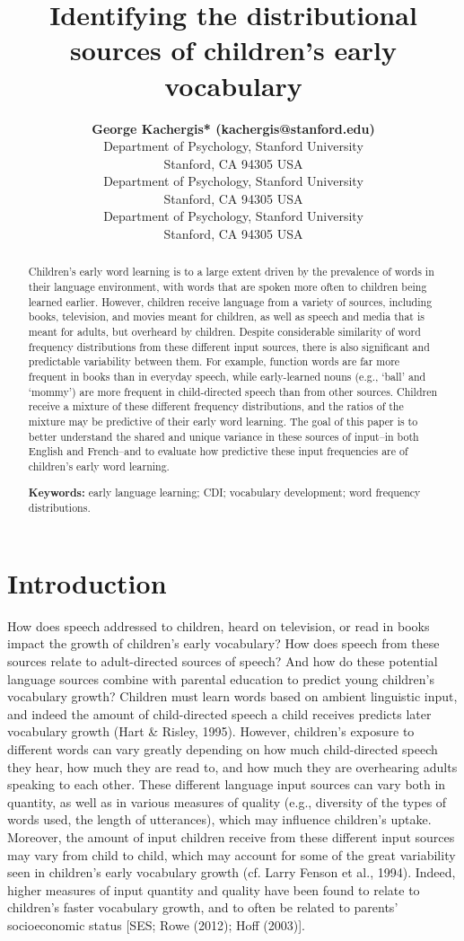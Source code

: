 \documentclass[10pt, letterpaper]{article}
\title{Identifying the distributional sources of children's early
vocabulary}
\author{{\large \bf George Kachergis* (kachergis@stanford.edu)} \\ Department of Psychology, Stanford University \\ Stanford, CA 94305 USA \AND {\large \bf Georgia Loukatou* (@stanford.edu)} \\ Department of Psychology, Stanford University \\ Stanford, CA 94305 USA \AND {\large \bf Michael C. Frank (mcfrank@stanford.edu)} \\ Department of Psychology, Stanford University \\ Stanford, CA 94305 USA}
\begin{document}
\maketitle

\begin{abstract}
Children's early word learning is to a large extent driven by the
prevalence of words in their language environment, with words that are
spoken more often to children being learned earlier. However, children
receive language from a variety of sources, including books, television,
and movies meant for children, as well as speech and media that is meant
for adults, but overheard by children. Despite considerable similarity
of word frequency distributions from these different input sources,
there is also significant and predictable variability between them. For
example, function words are far more frequent in books than in everyday
speech, while early-learned nouns (e.g., `ball' and `mommy') are more
frequent in child-directed speech than from other sources. Children
receive a mixture of these different frequency distributions, and the
ratios of the mixture may be predictive of their early word learning.
The goal of this paper is to better understand the shared and unique
variance in these sources of input--in both English and French--and to
evaluate how predictive these input frequencies are of children's early
word learning.

\textbf{Keywords:}
early language learning; CDI; vocabulary development; word frequency
distributions.
\end{abstract}

\hypertarget{introduction}{%
\section{Introduction}\label{introduction}}

How does speech addressed to children, heard on television, or read in
books impact the growth of children's early vocabulary? How does speech
from these sources relate to adult-directed sources of speech? And how
do these potential language sources combine with parental education to
predict young children's vocabulary growth? Children must learn words
based on ambient linguistic input, and indeed the amount of
child-directed speech a child receives predicts later vocabulary growth
(Hart \& Risley, 1995). However, children's exposure to different words
can vary greatly depending on how much child-directed speech they hear,
how much they are read to, and how much they are overhearing adults
speaking to each other. These different language input sources can vary
both in quantity, as well as in various measures of quality (e.g.,
diversity of the types of words used, the length of utterances), which
may influence children's uptake. Moreover, the amount of input children
receive from these different input sources may vary from child to child,
which may account for some of the great variability seen in children's
early vocabulary growth (cf. Larry Fenson et al., 1994). Indeed, higher
measures of input quantity and quality have been found to relate to
children's faster vocabulary growth, and to often be related to parents'
socioeconomic status {[}SES; Rowe (2012); Hoff (2003){]}.
\end{document}
